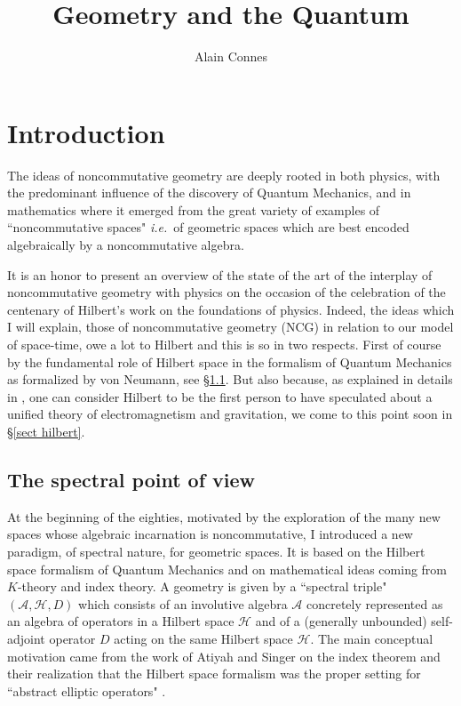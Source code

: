 \documentclass[12pt]{article}
\def\cA{{\mathcal A}}
\def\cH{{\mathcal H}}
\newcommand{\ie}{{\it i.e.\/}\ }
\begin{document}
\title{Geometry and the Quantum}
\author{Alain Connes}
\maketitle
\tableofcontents 
\section{Introduction}
The ideas of noncommutative geometry are deeply rooted in both physics, with the predominant influence of the discovery of Quantum Mechanics, and in mathematics where it emerged from the great variety of examples of ``noncommutative spaces" \ie of geometric spaces which are best encoded algebraically  by a  noncommutative algebra. 


It is an honor  to present an overview of the state of the art of the interplay of noncommutative geometry with physics on the occasion of the celebration of the centenary of Hilbert's work on the foundations of  physics.
Indeed, the ideas which I will  explain, those of noncommutative geometry (NCG) in relation to our model of space-time, owe a lot to Hilbert and this is so in two respects. First of course by the fundamental role of Hilbert space in the formalism of Quantum Mechanics as formalized by von Neumann, see \S \ref{spec sect}. But also because,  
as explained in details in \cite{corry,KS}, one can consider Hilbert to be   the first person to have speculated about a unified theory of electromagnetism and gravitation, we come to this point soon in \S \ref{sect hilbert}.


\subsection{The spectral point of view}\label{spec sect}
At the beginning of the eighties, motivated by the exploration of the many new spaces whose algebraic incarnation is noncommutative, I introduced a new paradigm, of spectral nature, for geometric spaces. It is based on the Hilbert space formalism of Quantum Mechanics and on mathematical ideas coming from $K$-theory and index theory. A geometry is given by a ``spectral triple" $(\cA,\cH,D)$ which consists of an involutive algebra $\cA$ concretely represented as an algebra of operators in a Hilbert space $\cH$ and of a (generally unbounded) self-adjoint operator $D$ acting on the same Hilbert space $\cH$. The main conceptual motivation came from the work of Atiyah and Singer on the index theorem and their realization that the Hilbert space formalism was the proper setting for ``abstract elliptic operators" \cite{Atiyah}.
\end{document}
